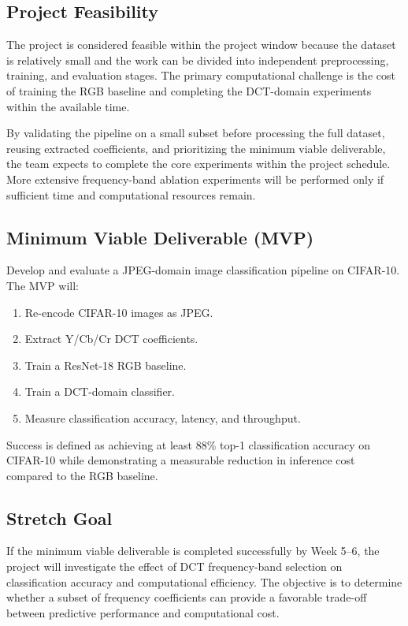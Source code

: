 \documentclass[11pt]{article}
\begin{document}
\subsection{Project Feasibility}

The project is considered feasible within the project window because
the dataset is relatively small and the work can be divided into
independent preprocessing, training, and evaluation stages. The primary
computational challenge is the cost of training the RGB baseline and
completing the DCT-domain experiments within the available time.

By validating the pipeline on a small subset before processing the full
dataset, reusing extracted coefficients, and prioritizing the minimum
viable deliverable, the team expects to complete the core experiments
within the project schedule. More extensive frequency-band ablation
experiments will be performed only if sufficient time and computational
resources remain.


\subsection{Minimum Viable Deliverable (MVP)}
Develop and evaluate a JPEG-domain image classification pipeline on CIFAR-10. The MVP will:

\begin{enumerate}
    \item Re-encode CIFAR-10 images as JPEG.
    \item Extract Y/Cb/Cr DCT coefficients.
    \item Train a ResNet-18 RGB baseline.
    \item Train a DCT-domain classifier.
    \item Measure classification accuracy, latency, and throughput.
\end{enumerate}

Success is defined as achieving at least 88\% top-1 classification accuracy on CIFAR-10 while demonstrating a measurable reduction in inference cost compared to the RGB baseline.

\subsection{Stretch Goal}

If the minimum viable deliverable is completed successfully by Week 5--6,
the project will investigate the effect of DCT frequency-band selection
on classification accuracy and computational efficiency. The objective
is to determine whether a subset of frequency coefficients can provide
a favorable trade-off between predictive performance and computational
cost.
\end{document}
